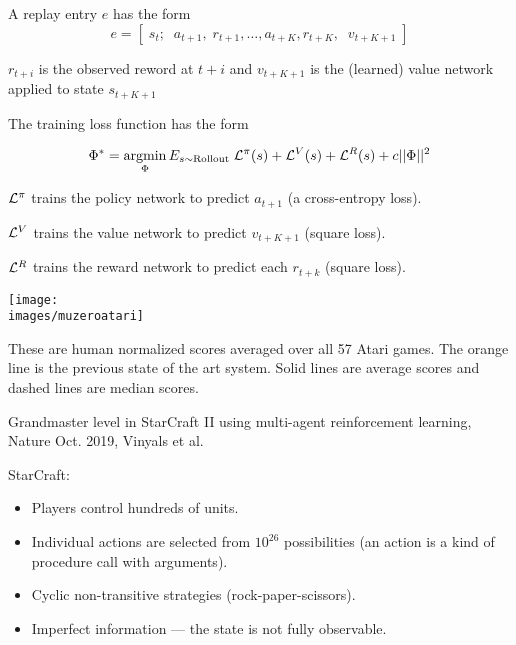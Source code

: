 {\vfill
A replay entry $e$ has the form
$$e = \left[\;s_t;\;\;a_{t+1},\;r_{t+1},\ldots,a_{t+K},r_{t+K},\;\;v_{t+K+1}\;\right]$$

\vfill
$r_{t+i}$ is the observed reword at $t+i$ and $v_{t+K+1}$ is the (learned) value network applied to state $s_{t+K+1}$


{\huge
The training loss function has the form

$$\Phi^* = \operatorname*{argmin}_\Phi E_{s \sim \mathrm{Rollout}}\;{\cal L}^\pi(s) + {\cal L}^V(s) +{\cal L}^R(s) + c||\Phi||^2$$
  
\vfill
${\cal L}^\pi$ trains the policy network to predict $a_{t+1}$ (a cross-entropy loss).

\vfill
${\cal L}^V$ trains the value network to predict $v_{t+K+1}$ (square loss).

\vfill
${\cal L}^R$ trains the reward network to predict each $r_{t+k}$ (square loss).
}



\centerline{\texttt{[image: \\images/muzeroatari]}}

{\huge
  These are human normalized scores averaged over all 57 Atari games.  The orange line is the previous state of the art system.  Solid lines are average scores and dashed lines are median scores.
}



Grandmaster level in StarCraft II using multi-agent reinforcement learning, Nature Oct. 2019, Vinyals et al.

\vfill
StarCraft:

\begin{itemize}
\item Players control hundreds of units.

\vfill
\item Individual actions are selected from $10^{26}$ possibilities (an action is a kind of procedure call with arguments).

\vfill
\item Cyclic non-transitive strategies (rock-paper-scissors).

\vfill
\item Imperfect information --- the state is not fully observable.
\end{itemize}

}
